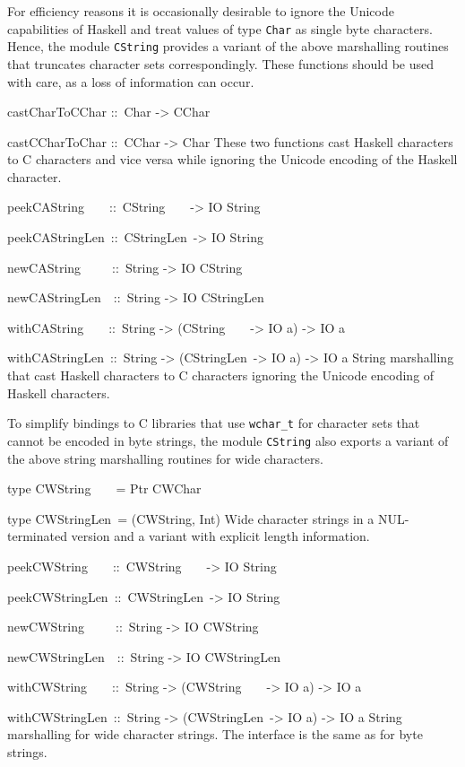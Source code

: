 \documentclass[a4paper,twoside]{article}
\makeatletter
\newcommand{\code}[1]{\texttt{#1}}      %
\newenvironment{codedesc}{%
  \list{}{\labelwidth\z@
    \let\makelabel\codedesclabel}
  }{%
  \endlist
  }
\newcommand*{\codedesclabel}[1]{%
  \hspace{-\leftmargin}
  \parbox[b]{\labelwidth}{\makebox[0pt][l]{\code{#1}}\\}\hfil\relax
  }
\newcommand{\combineitems}{\vspace*{-\itemsep}\vspace*{-\parsep}\vspace*{-1em}}
\makeatother
\begin{document}
For efficiency reasons it is occasionally desirable to ignore the Unicode
capabilities of Haskell and treat values of type \code{Char} as single byte
characters.  Hence, the module \code{CString} provides a variant of the above
marshalling routines that truncates character sets correspondingly.  These
functions should be used with care, as a loss of information can occur.
%
\begin{codedesc}
\item[castCharToCChar ::\ Char -> CChar]
\item[castCCharToChar ::\ CChar -> Char] \combineitems These two functions cast
  Haskell characters to C characters and vice versa while ignoring the Unicode
  encoding of the Haskell character.  

\item[peekCAString~~~~::\ CString~~~~-> IO String]
\item[peekCAStringLen~::\ CStringLen~-> IO String]\combineitems
\item[newCAString~~~~~::\ String -> IO CString]\combineitems
\item[newCAStringLen~~::\ String -> IO CStringLen] \combineitems
\item[withCAString~~~~::\ String -> (CString~~~~-> IO a) -> IO a]\combineitems
\item[withCAStringLen~::\ String -> (CStringLen~-> IO a) -> IO a]
  \combineitems String marshalling that cast Haskell characters to C
  characters ignoring the Unicode encoding of Haskell characters.
\end{codedesc}

To simplify bindings to C libraries that use \code{wchar\_t} for character
sets that cannot be encoded in byte strings, the module \code{CString} also
exports a variant of the above string marshalling routines for wide characters.
%
\begin{codedesc}
\item[type CWString~~~~= Ptr CWChar]
\item[type CWStringLen~= (CWString, Int)] \combineitems
  Wide character strings in a NUL-terminated version and a variant with
  explicit length information.

\item[peekCWString~~~~::\ CWString~~~~-> IO String]
\item[peekCWStringLen~::\ CWStringLen~-> IO String]\combineitems
\item[newCWString~~~~~::\ String -> IO CWString]\combineitems
\item[newCWStringLen~~::\ String -> IO CWStringLen] \combineitems
\item[withCWString~~~~::\ String -> (CWString~~~~-> IO a) -> IO a]\combineitems
\item[withCWStringLen~::\ String -> (CWStringLen~-> IO a) -> IO a]
  \combineitems String marshalling for wide character strings.  The interface
  is the same as for byte strings.
\end{codedesc}
\end{document}
